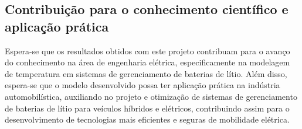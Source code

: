 \subsection{Contribuição para o conhecimento científico e aplicação prática}
Espera-se que os resultados obtidos com este projeto contribuam para o avanço do conhecimento na área de engenharia elétrica, especificamente na modelagem de temperatura em sistemas de gerenciamento de baterias de lítio. Além disso, espera-se que o modelo desenvolvido possa ter aplicação prática na indústria automobilística, auxiliando no projeto e otimização de sistemas de gerenciamento de baterias de lítio para veículos híbridos e elétricos, contribuindo assim para o desenvolvimento de tecnologias mais eficientes e seguras de mobilidade elétrica.
